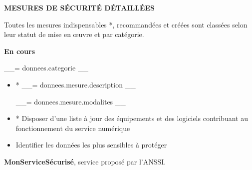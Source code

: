 \documentclass[9pt, a4paper]{article}
\begin{document}
  \textbf{MESURES DE SÉCURITÉ DÉTAILLÉES}

  \textcolor{gris}{Toutes les mesures indispensables *, recommandées et créées sont classées selon
  leur statut de mise en œuvre et par catégorie.}

  \vskip 0.5cm

  \textbf{En cours}

  \begin{tcolorbox}[colback=white, colframe=lisere, boxrule=1px]
    \textcolor{bleu}{__= donnees.categorie __}
    \begin{itemize}
      \item * __= donnees.mesure.description __

        \textcolor{gris}{__= donnees.mesure.modalites __}
      \item * Disposer d'une liste à jour des équipements et des logiciels contribuant au
        fonctionnement du service numérique
      \item Identifier les données les plus sensibles à protéger
    \end{itemize}
  \end{tcolorbox}

  \vskip 1cm

  \textcolor{bleu}{\textbf{MonServiceSécurisé}}, service proposé par l'ANSSI.
\end{document}
